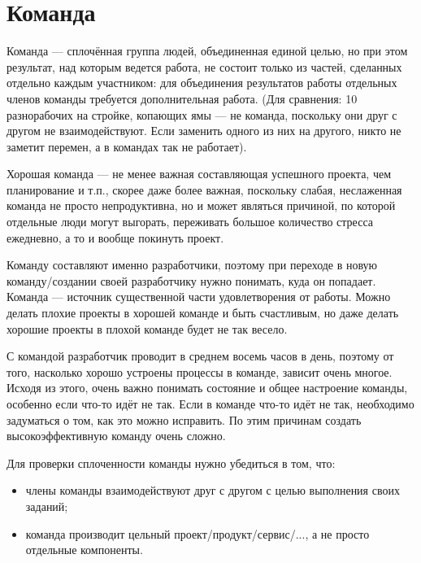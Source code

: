 \documentclass{../../text-style}
\begin{document}
\maketitle
\thispagestyle{empty}


\section{Команда}

Команда --- сплочённая группа людей, объединенная единой целью, но при этом результат, над которым ведется работа, не состоит только из частей, сделанных отдельно каждым участником: для объединения результатов работы отдельных членов команды требуется дополнительная работа. (Для сравнения: 10 разнорабочих на стройке, копающих ямы --- не команда, поскольку они друг с другом не взаимодействуют. Если заменить одного из них на другого, никто не заметит перемен, а в командах так не работает).

Хорошая команда --- не менее важная составляющая успешного проекта, чем планирование и т.п., скорее даже более важная, поскольку слабая, неслаженная команда не просто непродуктивна, но и может являться причиной, по которой отдельные люди могут выгорать, переживать большое количество стресса ежедневно, а то и вообще покинуть проект.

Команду составляют именно разработчики, поэтому при переходе в новую команду/создании своей разработчику нужно понимать, куда он попадает. Команда --- источник существенной части удовлетворения от работы. Можно делать плохие проекты в хорошей команде и быть счастливым, но даже делать хорошие проекты в плохой команде будет не так весело.

С командой разработчик проводит в среднем восемь часов в день, поэтому от того, насколько хорошо устроены процессы в команде, зависит очень многое. Исходя из этого, очень важно понимать состояние и общее настроение команды, особенно если что-то идёт не так. Если в команде что-то идёт не так, необходимо задуматься о том, как это можно исправить. По этим причинам создать высокоэффективную команду очень сложно.

Для проверки сплоченности команды нужно убедиться в том, что:

\begin{itemize}
    \item члены команды взаимодействуют друг с другом с целью выполнения своих заданий;
    \item команда производит цельный проект/продукт/сервис/..., а не просто отдельные компоненты.
\end{itemize}
\end{document}
